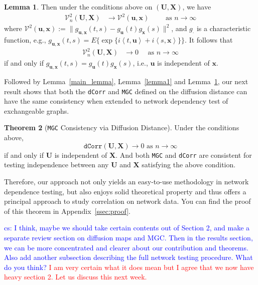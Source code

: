 \documentclass[11pt]{article}
\theoremstyle{definition}
\newtheorem{theorem}{Theorem}[section]
\newtheorem{lemma}[theorem]{Lemma}
\newcommand{\cs}[1]{\textcolor{blue}{cs: #1}}
\begin{document}
\begin{lemma}
	\label{lemma2}
	Then under the conditions above on $(\mathbf{U}, \mathbf{X})$, we have 
	\begin{eqnarray}
	\mathcal{V}_{n}^{2}(\mathbf{U},\mathbf{X}) &\longrightarrow \mathcal{V}^{2}(\mathbf{u},\mathbf{x}) \quad \quad \mbox{ as } n \rightarrow \infty
	\label{eq:conv1}
	\end{eqnarray}
	where $\mathcal{V}^{2} (\mathbf{u},\mathbf{x}) := \| g_{\mathbf{u},\mathbf{x}}(t,s) - g_{\mathbf{u}}(t) g_{\mathbf{x}}(s) \|^2$, and $g_{\cdot}$ is a characteristic function, e.g., $g_{\mathbf{u},\mathbf{x}}(t,s) = E\{\exp\{i \left\langle t,\mathbf{u} \right\rangle  +i \left\langle  s,\mathbf{x}\right\rangle \}\}$.
	It follows that 
	\begin{eqnarray}
	\mathcal{V}_{n}^{2}(\mathbf{U},\mathbf{X}) &\rightarrow 0 \quad \mbox{ as } n \rightarrow \infty
	\label{eq:conv2}
	\end{eqnarray}
if and only if $g_{\mathbf{u},\mathbf{x}}(t,s) = g_{\mathbf{u}}(t) g_{\mathbf{x}}(s)$, i.e., $\mathbf{u}$ is independent of $\mathbf{x}$.
\end{lemma}

Followed by Lemma~\ref{main_lemma}, Lemma~\ref{lemma1} and Lemma~\ref{lemma2}, our next result shows that both the \texttt{dCorr} and \texttt{MGC} defined on the diffusion distance can have the same consistency when extended to network dependency test of exchangeable graphs.

\begin{theorem}[\texttt{MGC} Consistency via Diffusion Distance]
Under the conditions above, 
$$\texttt{dCorr}(\mathbf{U}, \mathbf{X}) \longrightarrow 0 \mbox{ as } n \rightarrow \infty$$ 
if and only if $\mathbf{U}$ is independent of $\mathbf{X}$. And both \texttt{MGC} and \texttt{dCorr} are consistent for testing independence between any $\mathbf{U}$ and $\mathbf{X}$ satisfying the above condition.
	\label{theoremMain}
\end{theorem}

Therefore, our approach not only yields an easy-to-use methodology in network dependence testing, but also enjoys solid theoretical property and thus offers a principal approach to study correlation on network data. You can find the proof of this theorem in Appendix~\ref{ssec:proof}.

\cs{I think, maybe we should take certain contents out of Section 2, and make a separate review section on diffusion maps and MGC. Then in the results section, we can be more concentrated and clearer about our contribution and theorems. Also add another subsection describing the full network testing procedure. What do you think?}
\textcolor{red}{I am very certain what it does mean but I agree that we now have heavy section 2. Let us discuss this next week.}
\end{document}
